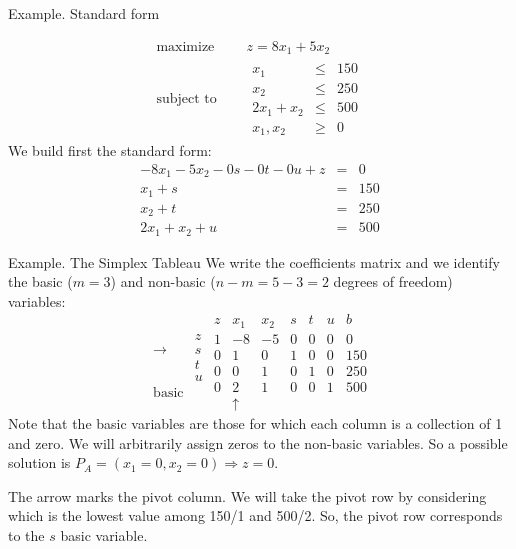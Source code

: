 \documentclass[c]{beamer}
\begin{document}
\begin{frame}{Example. Standard form}


  \begin{equation*}
    \begin{aligned}
      \text{maximize } \quad & z = 8x_1+5x_2 \\
      \text{subject to }\quad &
      \begin{array}{rcl}
        x_1 &\leq &150 \\
        x_2 &\leq &250 \\
        2x_1+x_2 &\leq &500 \\
        x_1,x_2 &\geq& 0
      \end{array}
    \end{aligned}
  \end{equation*}
We build first the standard form:
\begin{eqnarray*}
  -8x_1-5x_2-0s-0t-0u+z&=&0\\
  x_1+s&=&150\\
  x_2+t&=&250\\
  2x_1+x_2+u&=&500
\end{eqnarray*}
\end{frame}

\begin{frame}{Example. The Simplex Tableau}
  We write the coefficients matrix and we identify the basic ($m=3$) and non-basic ($n-m=5-3=2$ degrees of freedom) variables:
  \begin{equation}
\begin{array}{cc}
&\\
&z \\
\rightarrow &s \\
&t \\
&u\\
\mathrm{basic}
\end{array}
%
\begin{array}{c|ccccc|c}
  z & x_1 & x_2 & s & t & u & b \\ \hline
  1 & -8 & -5 & 0 & 0 & 0 & 0 \\ \hline
  0 & 1 & 0 & 1 & 0 & 0 & 150  \\
  0 & 0 & 1 & 0 & 1 & 0 & 250 \\
  0 & 2 & 1 & 0 & 0 & 1 & 500 \\
    & \uparrow & & & & &
\end{array}
\end{equation}
  Note that the basic variables are those for which each column is a collection of 1 and zero. We will arbitrarily assign zeros to the non-basic variables.
So a possible solution is $\boxed{P_A=(x_1=0, x_2=0)\Rightarrow z=0}$.

  The arrow marks the pivot column. We will take the pivot row by considering which is the lowest value among 150/1 and 500/2. So, the pivot row corresponds to the $s$ basic variable.
\end{frame}
\end{document}

